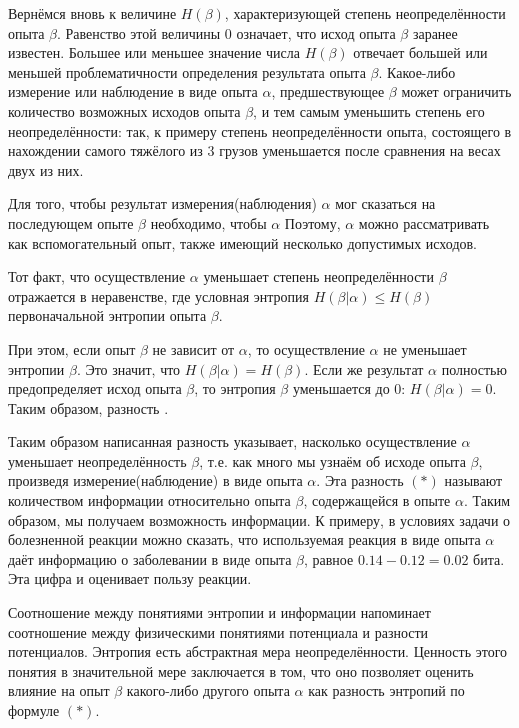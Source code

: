 ﻿\documentclass[a4paper,12pt]{report}
\begin{document}
	Вернёмся вновь к величине $H(\beta)$, характеризующей степень неопределённости опыта $\beta$. Равенство этой величины $0$ означает, что исход опыта $\beta$ заранее известен. Большее или меньшее значение числа $H(\beta)$ отвечает большей или меньшей проблематичности определения результата опыта $\beta$. Какое-либо измерение или наблюдение в виде опыта $\alpha$, предшествующее $\beta$ может ограничить количество возможных исходов опыта $\beta$, и тем самым уменьшить степень его неопределённости: так, к примеру степень неопределённости опыта, состоящего в нахождении самого тяжёлого из $3$ грузов уменьшается после сравнения на весах двух из них. 

	Для того, чтобы результат измерения(наблюдения) $\alpha$ мог сказаться на последующем опыте $\beta$ необходимо, чтобы $\alpha$  Поэтому, $\alpha$ можно рассматривать как вспомогательный опыт, также имеющий несколько допустимых исходов. 
	
	Тот факт, что осуществление $\alpha$ уменьшает степень неопределённости $\beta$ отражается в неравенстве, где условная энтропия $H(\beta|\alpha) \le H(\beta)$ первоначальной энтропии опыта $\beta$.


	При этом, если опыт $\beta$ не зависит от $\alpha$, то осуществление $\alpha$ не уменьшает энтропии $\beta$. Это значит, что $H(\beta|\alpha) = H(\beta)$. Если же результат $\alpha$ полностью предопределяет исход опыта $\beta$, то энтропия $\beta$ уменьшается до $0$: $H(\beta|\alpha) = 0$. Таким образом, разность .

	Таким образом написанная разность указывает, насколько осуществление $\alpha$ уменьшает неопределённость $\beta$, т.е. как много мы узнаём об исходе опыта $\beta$, произведя измерение(наблюдение) в виде опыта $\alpha$. Эта разность $(*)$ называют количеством информации относительно опыта $\beta$, содержащейся в опыте $\alpha$. Таким образом, мы получаем возможность  информации. К примеру, в условиях задачи о болезненной реакции можно сказать, что используемая реакция в виде опыта $\alpha$ даёт информацию о заболевании в виде опыта $\beta$, равное $0.14-0.12 = 0.02$ бита. Эта цифра и оценивает пользу реакции.
	
	Соотношение между понятиями энтропии и информации напоминает соотношение между физическими понятиями потенциала и разности потенциалов. Энтропия есть абстрактная мера неопределённости. Ценность этого понятия в значительной мере заключается в том, что оно позволяет оценить влияние на опыт $\beta$ какого-либо другого опыта $\alpha$ как разность энтропий по формуле $(*)$.
	
\end{document}
